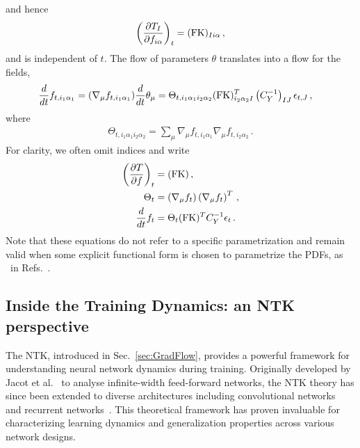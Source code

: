 and hence
\begin{align}
    \label{eq:dTbydf}
    \left(\frac{\partial T_I}{\partial f_{i\alpha}}\right)_t =
        (\mathrm{FK})_{Ii\alpha}\, ,
\end{align}
and is independent of $t$. The flow of parameters $\theta$ translates into a
flow for the fields,
\begin{align}
    \label{eq:NTKFlow}
    \frac{d}{dt} &f_{t,i_1\alpha_1} = (\nabla_\mu f_{t,i_1\alpha_1}) \frac{d}{dt} \theta_\mu =
      \Theta_{t,i_1\alpha_1i_2\alpha_2}
      (\mathrm{FK})^T_{i_2\alpha_2I} \left(C_Y^{-1}\right)_{IJ} \epsilon_{t,J}\, ,
\end{align}
where
\begin{align}
    \label{eq:NTKDef}
    \Theta_{t,i_1\alpha_1i_2\alpha_2} = \sum_\mu
    \nabla_\mu f_{t,i_1\alpha_1} \nabla_\mu f_{t,i_2\alpha_2}\, .
\end{align}
For clarity, we often omit indices and write
\begin{align}
    \label{eq:dTdfForLinearObs}
    \left(\frac{\partial T}{\partial f}\right)_t
        &= (\mathrm{FK})\, , \\
    \label{eq:NTKDefNoIndices}
    \Theta_t
        &= \left(\nabla_\mu f_t\right) \left(\nabla_\mu f_t\right)^T\, , \\
    \label{eq:FlowEquationNoIndices}
    \frac{d}{dt} f_t
        &= \Theta_t (\mathrm{FK})^T C_Y^{-1} \epsilon_t\, .
\end{align}
Note that these equations do not refer to a specific parametrization and remain
valid when some explicit functional form is chosen to parametrize the PDFs, as
\eg\ in Refs.~\cite{Bailey:2020ooq,Hou:2019efy}.

\subsection{Inside the Training Dynamics: an NTK perspective}

The NTK, introduced in Sec.~\ref{sec:GradFlow}, provides a powerful framework
for understanding neural network dynamics during training. Originally developed
by Jacot et al.~\cite{jacot2018neural} to analyse infinite-width feed-forward
networks, the NTK theory has since been extended to diverse architectures
including convolutional networks~\cite{arora2019exact} and recurrent
networks~\cite{alemohammad2021recurrent}. This theoretical framework has proven
invaluable for characterizing learning dynamics and generalization properties
across various network designs.

